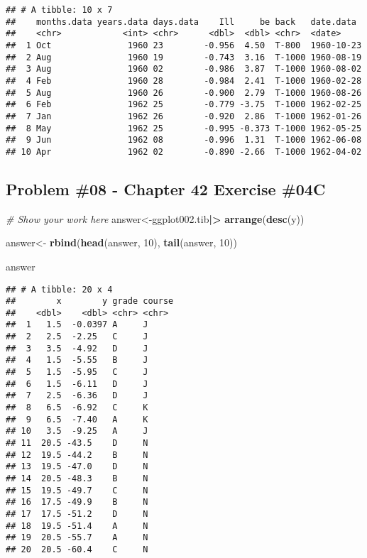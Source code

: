 \documentclass[
]{article}
\newenvironment{Shaded}{\begin{snugshade}}{\end{snugshade}}
\newcommand{\CommentTok}[1]{\textcolor[rgb]{0.56,0.35,0.01}{\textit{#1}}}
\newcommand{\DecValTok}[1]{\textcolor[rgb]{0.00,0.00,0.81}{#1}}
\newcommand{\FunctionTok}[1]{\textcolor[rgb]{0.13,0.29,0.53}{\textbf{#1}}}
\newcommand{\NormalTok}[1]{#1}
\newcommand{\OtherTok}[1]{\textcolor[rgb]{0.56,0.35,0.01}{#1}}
\newcommand{\SpecialCharTok}[1]{\textcolor[rgb]{0.81,0.36,0.00}{\textbf{#1}}}
\begin{document}
\begin{verbatim}
## # A tibble: 10 x 7
##    months.data years.data days.data    Ill     be back   date.data 
##    <chr>            <int> <chr>      <dbl>  <dbl> <chr>  <date>    
##  1 Oct               1960 23        -0.956  4.50  T-800  1960-10-23
##  2 Aug               1960 19        -0.743  3.16  T-1000 1960-08-19
##  3 Aug               1960 02        -0.986  3.87  T-1000 1960-08-02
##  4 Feb               1960 28        -0.984  2.41  T-1000 1960-02-28
##  5 Aug               1960 26        -0.900  2.79  T-1000 1960-08-26
##  6 Feb               1962 25        -0.779 -3.75  T-1000 1962-02-25
##  7 Jan               1962 26        -0.920  2.86  T-1000 1962-01-26
##  8 May               1962 25        -0.995 -0.373 T-1000 1962-05-25
##  9 Jun               1962 08        -0.996  1.31  T-1000 1962-06-08
## 10 Apr               1962 02        -0.890 -2.66  T-1000 1962-04-02
\end{verbatim}

\newpage

\hypertarget{problem-08---chapter-42-exercise-04c}{%
\subsection{Problem \#08 - Chapter 42 Exercise
\#04C}\label{problem-08---chapter-42-exercise-04c}}

\begin{Shaded}
\begin{Highlighting}[]
\CommentTok{\# Show your work here}
\NormalTok{answer}\OtherTok{\textless{}{-}}\NormalTok{ggplot002.tib}\SpecialCharTok{|\textgreater{}}
  \FunctionTok{arrange}\NormalTok{(}\FunctionTok{desc}\NormalTok{(y))}

\NormalTok{answer}\OtherTok{\textless{}{-}} \FunctionTok{rbind}\NormalTok{(}\FunctionTok{head}\NormalTok{(answer, }\DecValTok{10}\NormalTok{), }\FunctionTok{tail}\NormalTok{(answer, }\DecValTok{10}\NormalTok{))}

\NormalTok{answer}
\end{Highlighting}
\end{Shaded}

\begin{verbatim}
## # A tibble: 20 x 4
##        x        y grade course
##    <dbl>    <dbl> <chr> <chr> 
##  1   1.5  -0.0397 A     J     
##  2   2.5  -2.25   C     J     
##  3   3.5  -4.92   D     J     
##  4   1.5  -5.55   B     J     
##  5   1.5  -5.95   C     J     
##  6   1.5  -6.11   D     J     
##  7   2.5  -6.36   D     J     
##  8   6.5  -6.92   C     K     
##  9   6.5  -7.40   A     K     
## 10   3.5  -9.25   A     J     
## 11  20.5 -43.5    D     N     
## 12  19.5 -44.2    B     N     
## 13  19.5 -47.0    D     N     
## 14  20.5 -48.3    B     N     
## 15  19.5 -49.7    C     N     
## 16  17.5 -49.9    B     N     
## 17  17.5 -51.2    D     N     
## 18  19.5 -51.4    A     N     
## 19  20.5 -55.7    A     N     
## 20  20.5 -60.4    C     N
\end{verbatim}
\end{document}
